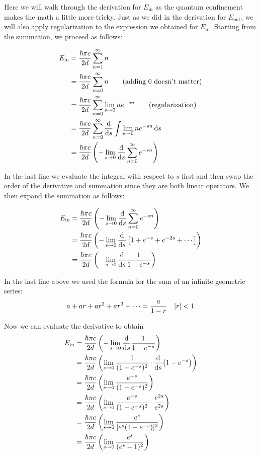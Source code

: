 Here we will walk through the derivation for $E_{\text{in}}$ as the quantum confinement makes the math a little more tricky. Just as we did in the derivation for $E_{\text{out}}$, we will also apply regularization to the expression we obtained for $E_{\text{in}}$. Starting from the summation, we proceed as follows:

\begin{align*}
E_{\text{in}} &= \frac{\hbar \pi c}{2d} \sum_{n=1}^{\infty} n \\
&= \frac{\hbar \pi c}{2d} \sum_{n=0}^{\infty} n \tag{adding 0 doesn't matter} \\
&= \frac{\hbar \pi c}{2d} \sum_{n=0}^{\infty} \lim\limits_{s \rightarrow 0} ne^{-sn} \tag{regularization} \\
&= \frac{\hbar \pi c}{2d} \sum_{n=0}^{\infty} \dv{s} \int \lim\limits_{s \rightarrow 0} ne^{-sn} \dd{s} \\
&= \frac{\hbar \pi c}{2d} \left( - \lim\limits_{s \rightarrow 0} \dv{s} \sum_{n=0}^{\infty} e^{-sn} \right)
\end{align*}

In the last line we evaluate the integral with respect to $s$ first and then swap the order of the derivative and summation since they are both linear operators. We then expand the summation as follows:

\begin{align*} 
E_{\text{in}} &= \frac{\hbar \pi c}{2d} \left( - \lim\limits_{s \rightarrow 0} \dv{s} \sum_{n=0}^{\infty} e^{-sn} \right) \\
&= \frac{\hbar \pi c}{2d} \left( - \lim\limits_{s \rightarrow 0} \dv{s} \left[ 1 + e^{-s} + e^{-2s} + \cdots \right] \right) \\
&= \frac{\hbar \pi c}{2d} \left( - \lim\limits_{s \rightarrow 0} \dv{s} \frac{1}{1-e^{-s}} \right)
\end{align*}

In the last line above we used the formula for the sum of an infinite geometric series: 
\begin{equation*}
	a + ar + ar^2 + ar^3 + \cdots = \frac{a}{1-r}\quad \abs{r} < 1
\end{equation*}

Now we can evaluate the derivative to obtain
\begin{align*}
E_{\text{in}} &= \frac{\hbar \pi c}{2d} \left( - \lim\limits_{s \rightarrow 0} \dv{s} \frac{1}{1-e^{-s}} \right) \\
&= \frac{\hbar \pi c}{2d} \left( \lim\limits_{s \rightarrow 0} \frac{1}{(1-e^{-s})^2} \cdot \dv{s} (1-e^{-s}) \right) \\
&= \frac{\hbar \pi c}{2d} \left( \lim\limits_{s \rightarrow 0} \frac{e^{-s}}{(1-e^{-s})^2} \right) \\
&= \frac{\hbar \pi c}{2d} \left( \lim\limits_{s \rightarrow 0} \frac{e^{-s}}{(1-e^{-s})^2} \cdot \frac{e^{2s}}{e^{2s}} \right) \\
&= \frac{\hbar \pi c}{2d} \left( \lim\limits_{s \rightarrow 0} \frac{e^{s}}{[e^s(1-e^{-s})]^2} \right) \\
&= \frac{\hbar \pi c}{2d} \left( \lim\limits_{s \rightarrow 0} \frac{e^{s}}{(e^s-1)^2} \right)
\end{align*}

